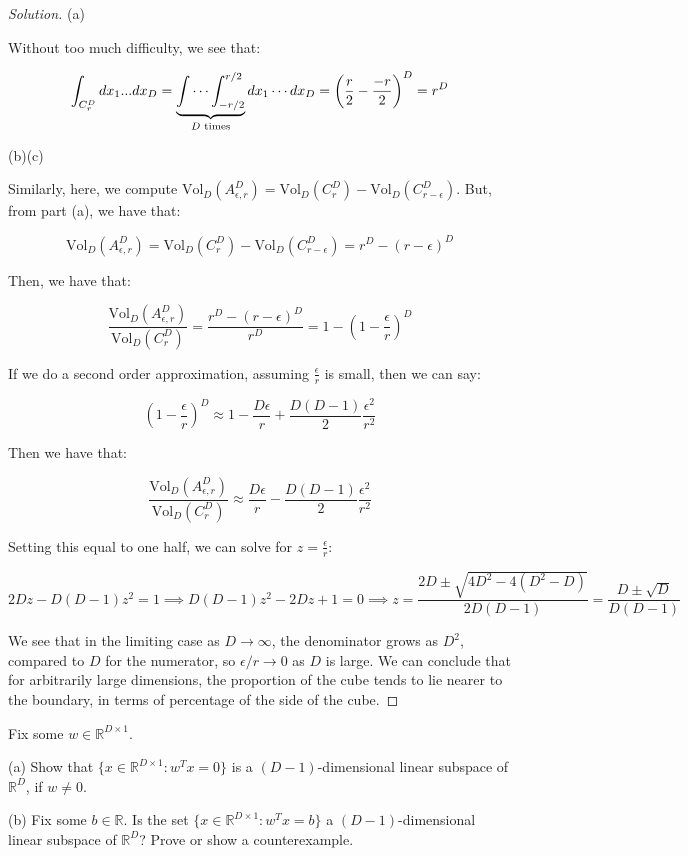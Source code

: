 \documentclass[10pt]{article}
\newcommand{\vol}{{\text{Vol}}}
\newenvironment{problem}[2][]{\begin{trivlist}
\item[\hskip \labelsep {\bfseries #1}\hskip \labelsep {\bfseries #2.}]}{\end{trivlist}}
\begin{document}
\begin{proof}[Solution]

(a)

Without too much difficulty, we see that:

$$\int_{C_r^D} dx_1...dx_D = \underbrace{ \idotsint_{-r/2}^{r/2}}_{D \text{ times}} dx_1 \cdots dx_D = \left( \frac{r}{2} - \frac{-r}{2} \right)^D = r^D$$

(b)(c)

Similarly, here, we compute $\vol_D(A_{\epsilon, r}^D) = \vol_D( C_r^D) - \vol_D( C_{r-\epsilon}^D)$. But, from part (a), we have that:

$$\vol_D(A_{\epsilon, r}^D) = \vol_D( C_r^D) - \vol_D( C_{r-\epsilon}^D) =r^D - (r - \epsilon)^D $$

Then, we have that:

$$ \frac{\vol_D(A_{\epsilon, r}^D)}{\vol_D( C_r^D)} = \frac{r^D - (r - \epsilon)^D}{r^D}= 1 - \left(1 - \frac{\epsilon}{r}\right)^D$$

If we do a second order approximation, assuming $\frac{\epsilon}{r}$ is small, then we can say:

$$  \left(1 - \frac{\epsilon}{r}\right)^D \approx 1 - \frac{D \epsilon}{r}+ \frac{D(D-1)}{2} \frac{\epsilon^2}{r^2} $$

Then we have that:

$$\frac{\vol_D(A_{\epsilon, r}^D)}{\vol_D( C_r^D)} \approx \frac{D \epsilon}{r} - \frac{D(D-1)}{2} \frac{\epsilon^2}{r^2}$$

Setting this equal to one half, we can solve for $z = \frac{\epsilon}{r}$:

$$ 2Dz - D(D-1) z^2 = 1 \implies D(D-1) z^2 - 2Dz + 1 = 0 \implies z = \frac{2D \pm \sqrt{4D^2 - 4(D^2 - D)}}{2D(D-1)} = \frac{D \pm \sqrt{D}}{D(D-1)}$$

We see that in the limiting case as $D \to \infty$, the denominator grows as $D^2$, compared to $D$ for the numerator, so $\epsilon/r \to 0$ as $D$ is large. We can conclude that for arbitrarily large dimensions, the proportion of the cube tends to lie nearer to the boundary, in terms of percentage of the side of the cube.


\end{proof}

\begin{problem}{Question 2}

Fix some $w \in \mathbb{R}^{D \times 1}$.

(a) Show that $\{ x \in \mathbb{R}^{D \times 1} : w^T x = 0 \}$ is a $(D-1)$-dimensional linear subspace of $\mathbb{R}^D$, if $w \not = 0$.

(b) Fix some $b \in \mathbb{R}$. Is the set $\{ x \in \mathbb{R}^{D \times 1} : w^T x = b \}$ a $(D-1)$-dimensional linear subspace of $\mathbb{R}^D$? Prove or show a counterexample.


\end{problem}
\end{document}
